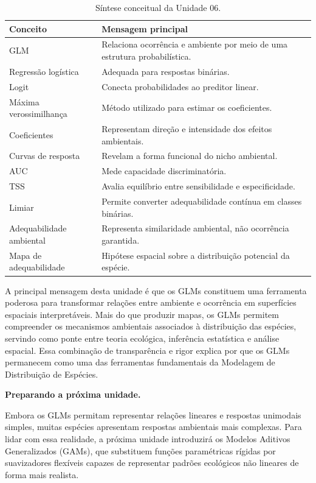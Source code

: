 \begin{table}[H]
	\centering
	\caption{Síntese conceitual da Unidade 06.}
	\begin{tabular}{p{4cm} p{10cm}}
		\hline
		Conceito & Mensagem principal \\
		\hline
		GLM & Relaciona ocorrência e ambiente por meio de uma estrutura probabilística. \\
		Regressão logística & Adequada para respostas binárias. \\
		Logit & Conecta probabilidades ao preditor linear. \\
		Máxima verossimilhança & Método utilizado para estimar os coeficientes. \\
		Coeficientes & Representam direção e intensidade dos efeitos ambientais. \\
		Curvas de resposta & Revelam a forma funcional do nicho ambiental. \\
		AUC & Mede capacidade discriminatória. \\
		TSS & Avalia equilíbrio entre sensibilidade e especificidade. \\
		Limiar & Permite converter adequabilidade contínua em classes binárias. \\
		Adequabilidade ambiental & Representa similaridade ambiental, não ocorrência garantida. \\
		Mapa de adequabilidade & Hipótese espacial sobre a distribuição potencial da espécie. \\
		\hline
	\end{tabular}
	\label{tab:sintese_glm}
\end{table}

A principal mensagem desta unidade é que os GLMs constituem uma ferramenta poderosa para transformar relações entre ambiente e ocorrência em superfícies espaciais interpretáveis. Mais do que produzir mapas, os GLMs permitem compreender os mecanismos ambientais associados à distribuição das espécies, servindo como ponte entre teoria ecológica, inferência estatística e análise espacial. Essa combinação de transparência e rigor explica por que os GLMs permanecem como uma das ferramentas fundamentais da Modelagem de Distribuição de Espécies.

\bigskip

\textbf{Preparando a próxima unidade.}

Embora os GLMs permitam representar relações lineares e respostas unimodais simples, muitas espécies apresentam respostas ambientais mais complexas. Para lidar com essa realidade, a próxima unidade introduzirá os Modelos Aditivos Generalizados (GAMs), que substituem funções paramétricas rígidas por suavizadores flexíveis capazes de representar padrões ecológicos não lineares de forma mais realista.


